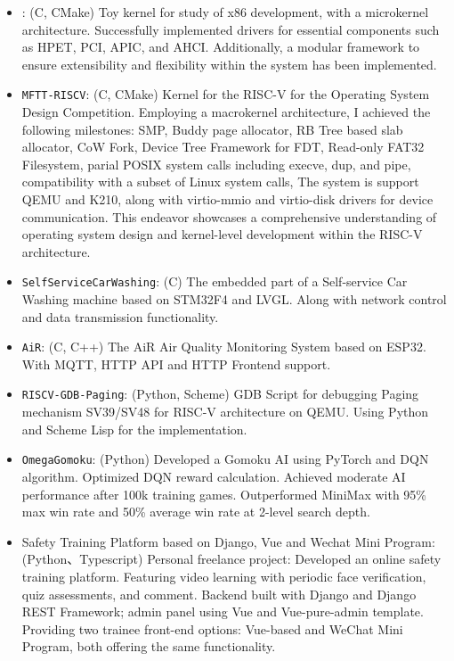 \documentclass[zh]{resume}
\begin{document}
\begin{itemize}
	\item {}:
	(C, CMake)
Toy kernel for study of x86 development, with a microkernel architecture. Successfully implemented drivers for essential components such as HPET, PCI, APIC, and AHCI. Additionally, a modular framework to ensure extensibility and flexibility within the system has been implemented.
	\item {} {\texttt{MFTT-RISCV}}:
	(C, CMake)
Kernel for the RISC-V for the Operating System Design Competition. Employing a macrokernel architecture, I achieved the following milestones: SMP, Buddy  page allocator, RB Tree based slab allocator, CoW Fork, Device Tree Framework for FDT, Read-only FAT32 Filesystem, parial POSIX system calls including execve, dup, and pipe, compatibility with a subset of Linux system calls, The system is support QEMU and K210, along with virtio-mmio and virtio-disk drivers for device communication. This endeavor showcases a comprehensive understanding of operating system design and kernel-level development within the RISC-V architecture.
	\item {} {\texttt{SelfServiceCarWashing}}:
	(C)
The embedded part of a Self-service Car Washing machine based on STM32F4 and LVGL. Along with network control and data transmission functionality.
	\item {} {\texttt{AiR}}:
	(C, C++)
The AiR Air Quality Monitoring System based on ESP32. With MQTT, HTTP API and HTTP Frontend support.
\end{itemize}

\begin{itemize}
	\item {} {\texttt{RISCV-GDB-Paging}}:
	(Python, Scheme)
GDB Script for debugging Paging mechanism SV39/SV48 for RISC-V architecture on QEMU. Using Python and Scheme Lisp for the implementation.
	\item {} {\texttt{OmegaGomoku}}:
	(Python)
Developed a Gomoku AI using PyTorch and DQN algorithm. Optimized DQN reward calculation. Achieved moderate AI performance after 100k training games. Outperformed MiniMax with 95\% max win rate and 50\% average win rate at 2-level search depth.

	\item Safety Training Platform based on Django, Vue and Wechat Mini Program:
	(Python、Typescript)
Personal freelance project: Developed an online safety training platform. Featuring video learning with periodic face verification, quiz assessments, and comment. Backend built with Django and Django REST Framework; admin panel using Vue and Vue-pure-admin template. Providing two trainee front-end options: Vue-based and WeChat Mini Program, both offering the same functionality.

\end{itemize}
\end{document}
